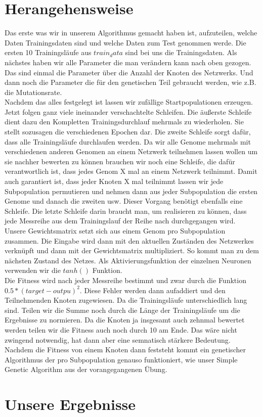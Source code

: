 \documentclass{hbrs-ecta-report}
\begin{document}
\section{Herangehensweise}
 Das erste was wir in unserem Algorithmus gemacht haben ist, aufzuteilen, welche Daten Trainingsdaten sind und welche Daten zum Test genommen werde. Die ersten 10 Trainingsläufe aus $train_data$ sind bei uns die Trainingsdaten. 
 Als nächstes haben wir alle Parameter die man verändern kann nach oben gezogen. Das sind einmal die Parameter über die Anzahl der Knoten des Netzwerks. Und dann noch die Parameter die für den genetischen Teil gebraucht werden, wie z.B. die Mutationsrate.\\
 Nachdem das alles festgelegt ist lassen wir zufällige Startpopulationen erzeugen. Jetzt folgen ganz viele ineinander verschachtelte Schleifen. 
 Die äußerste Schleife dient dazu den Kompletten Trainingsdurchlauf mehrmals zu wiederholen. Sie stellt sozusagen die verschiedenen Epochen dar. Die zweite Schleife sorgt dafür, dass alle Trainingsläufe durchlaufen werden.
 Da wir alle Genome mehrmals mit verschiedenen anderen Genomen an einem Netzwerk teilnehmen lassen wollen um sie nachher bewerten zu können brauchen wir noch eine Schleife, die dafür verantwortlich ist, dass jedes Genom X mal an einem Netzwerk teilnimmt. Damit auch garantiert ist, dass jeder Knoten X mal teilnimmt lassen wir jede Subpopulation permutieren und nehmen dann aus jeder Subpopulation die ersten Genome und danach die zweiten usw. Dieser Vorgang benötigt ebenfalls eine Schleife. Die letzte Schleife darin braucht man, um realisieren zu können, dass jede Messreihe aus dem Trainingslauf der Reihe nach durchgegangen wird.\\
 Unsere Gewichtsmatrix setzt sich aus einem Genom pro Subpopulation zusammen. Die Eingabe wird dann mit den aktuellen Zuständen des Netzwerkes verknüpft und dann mit der Gewichtsmatrix multipliziert. So kommt man zu dem nächsten Zustand des Netzes. Als Aktivierungsfunktion der einzelnen Neuronen verwenden wir die $tanh()$ Funktion.  \\
 Die Fitness wird nach jeder Messreihe bestimmt und zwar durch die Funktion $ 0.5 * (target-outpu)^2 $. Diese Fehler werden dann aufaddiert und den Teilnehmenden Knoten zugewiesen. Da die Trainingsläufe unterschiedlich lang sind. Teilen wir die Summe noch durch die Länge der Trainingsläufe um die Ergebnisse zu normieren. Da die Knoten ja insgesamt auch zehnmal bewertet werden teilen wir die Fitness auch noch durch 10 am Ende. Das wäre nicht zwingend notwendig, hat dann aber eine semnatisch stärkere Bedeutung. 
 Nachdem die Fitness von einem Knoten dann feststeht kommt ein genetischer Algorithmus der pro Subpopulation genauso funktioniert, wie unser Simple Genetic Algorithm aus der vorangegangenen Übung.



\section{Unsere Ergebnisse}
\end{document}
